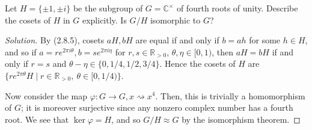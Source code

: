 \documentclass[12pt]{article}
\theoremstyle{remark}
\begin{document}
\setcounter{subsubsection}{3}
\begin{problem}
  Let $H = \{\pm1,\pm i\}$ be the subgroup of $G = \mathbb{C}^\times$ of fourth roots of unity. Describe the cosets of $H$ in $G$ explicitly. Is $G/H$ isomorphic to $G$?
\end{problem}
\begin{proof}[Solution]
  By (2.8.5), cosets $aH,bH$ are equal if and only if $b = ah$ for some $h \in H$, and so if $a = re^{2\pi i\theta},b = se^{2\pi i\eta}$ for $r,s \in \mathbb{R}_{>0}$, $\theta,\eta \in [0,1)$, then $aH = bH$ if and only if $r=s$ and $\theta - \eta \in \{0,1/4,1/2,3/4\}$. Hence the cosets of $H$ are $\{re^{2\pi \theta}H \mid r \in \mathbb{R}_{>0},~\theta \in [0,1/4)\}$.
  \par Now consider the map $\varphi\colon G \to G, x \rightsquigarrow x^4$. Then, this is trivially a homomorphism of $G$; it is moreover surjective since any nonzero complex number has a fourth root. We see that $\ker\varphi = H$, and so $G/H \approx G$ by the isomorphism theorem.
\end{proof}
\end{document}
